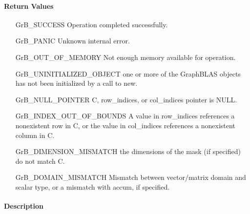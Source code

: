 \paragraph{Return Values}

\begin{itemize}[leftmargin=2.1in]
\item[{\sf GrB\_SUCCESS}]             Operation completed successfully.
\item[{\sf GrB\_PANIC}]               Unknown internal error.
\item[{\sf GrB\_OUT\_OF\_MEMORY}]            Not enough memory available for operation.
\item[{\sf GrB\_UNINITIALIZED\_OBJECT}]          one or more of the GraphBLAS objects has
                                    not been initialized by a call to {\sf new}.
\item[{\sf GrB\_NULL\_POINTER}]    {\sf C}, {\sf row\_indices}, or {\sf col\_indices} pointer is {\sf NULL}.
\item[{\sf GrB\_INDEX\_OUT\_OF\_BOUNDS}]
        A value in {\sf row\_indices} references a nonexistent row in {\sf C}, or
        the value in {\sf col\_indices} references a nonexistent column in {\sf C}.
\item[{\sf GrB\_DIMENSION\_MISMATCH}] 
        the dimensions of the mask (if specified) do not match {\sf C}.
\item[{\sf GrB\_DOMAIN\_MISMATCH}]    Mismatch between vector/matrix domain and scalar type,
                                      or a mismatch with {\sf accum}, if specified.
\end{itemize}


\paragraph{Description}

